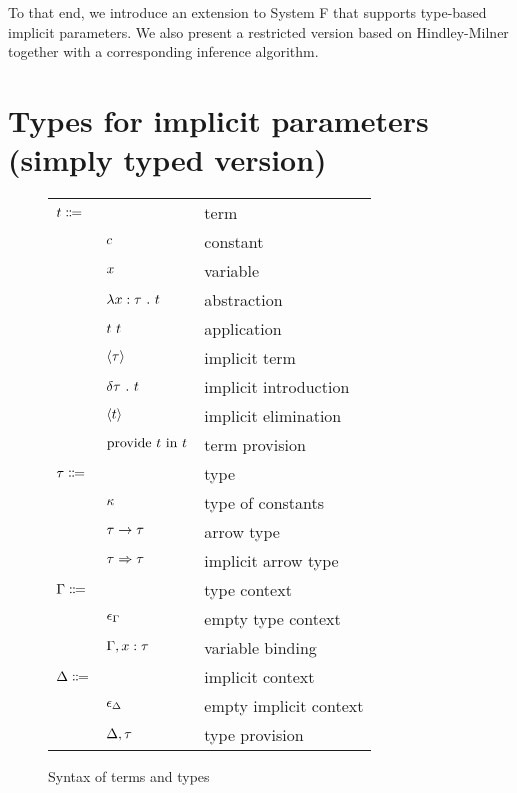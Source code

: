 \documentclass[acmlarge]{acmart}
\begin{document}
  To that end, we introduce an extension to System F that supports type-based implicit parameters. We also present a restricted version based on Hindley-Milner together with a corresponding inference algorithm.

\section{Types for implicit parameters (simply typed version)}

  \begin{figure}
    \begin{mdframed}

      \begin{tabular}{l l l}
        $t \Coloneqq $ & & term \\
        & $c$ & constant \\
        & $x$ & variable \\
        & $\lambda x : \tau \ . \ t$ & abstraction \\
        & $t \ t$ & application \\
        & $\left\langle \tau \right\rangle$ & implicit term \\
        & $\delta \tau \ . \ t$ & implicit introduction \\
        & $\left\langle t \right\rangle$ & implicit elimination \\
        & $\text{provide } t \text{ in } t$ & term provision \\
        $\tau \Coloneqq$ & & type \\
        & $\kappa$ & type of constants \\
        & $\tau \rightarrow \tau$ & arrow type \\
        & $\tau \Rightarrow \tau$ & implicit arrow type \\
        $\Gamma \Coloneqq$ & & type context \\
        & $\epsilon_{\Gamma}$ & empty type context \\
        & $\Gamma, x : \tau$ & variable binding \\
        $\Delta \Coloneqq$ & & implicit context \\
        & $\epsilon_{\Delta}$ & empty implicit context \\
        & $\Delta, \tau$ & type provision
      \end{tabular}

      \caption{Syntax of terms and types}
      \label{fig:terms_syntax}

    \end{mdframed}
  \end{figure}
\end{document}

